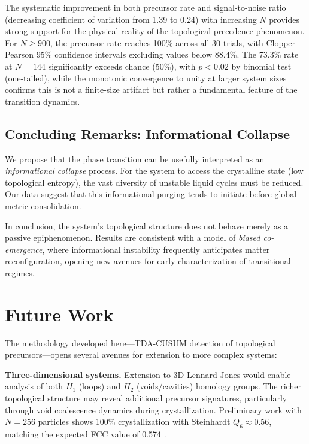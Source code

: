 \documentclass[twocolumn,showpacs,preprintnumbers,amsmath,amssymb,prb,floatfix]{revtex4-2}
\begin{document}
The systematic improvement in both precursor rate and signal-to-noise ratio (decreasing coefficient of variation from 1.39 to 0.24) with increasing $N$ provides strong support for the physical reality of the topological precedence phenomenon. For $N \geq 900$, the precursor rate reaches 100\% across all 30 trials, with Clopper-Pearson 95\% confidence intervals excluding values below 88.4\%. The 73.3\% rate at $N=144$ significantly exceeds chance (50\%), with $p < 0.02$ by binomial test (one-tailed), while the monotonic convergence to unity at larger system sizes confirms this is not a finite-size artifact but rather a fundamental feature of the transition dynamics.

\subsection{Concluding Remarks: Informational Collapse}

We propose that the phase transition can be usefully interpreted as an \textit{informational collapse} process. For the system to access the crystalline state (low topological entropy), the vast diversity of unstable liquid cycles must be reduced. Our data suggest that this informational purging tends to initiate before global metric consolidation.

In conclusion, the system's topological structure does not behave merely as a passive epiphenomenon. Results are consistent with a model of \textit{biased co-emergence}, where informational instability frequently anticipates matter reconfiguration, opening new avenues for early characterization of transitional regimes.

\section{Future Work}

The methodology developed here---TDA-CUSUM detection of topological precursors---opens several avenues for extension to more complex systems:

\textbf{Three-dimensional systems.} Extension to 3D Lennard-Jones would enable analysis of both $H_1$ (loops) and $H_2$ (voids/cavities) homology groups. The richer topological structure may reveal additional precursor signatures, particularly through void coalescence dynamics during crystallization. Preliminary work with $N=256$ particles shows 100\% crystallization with Steinhardt $Q_6 \approx 0.56$, matching the expected FCC value of 0.574 \cite{steinhardt1983}.
\end{document}
